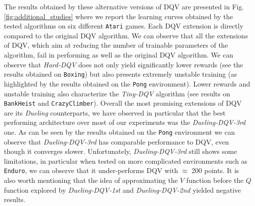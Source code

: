 The results obtained by these alternative versions of DQV are presented in Fig. \ref{fig:additional_studies} where we report the learning curves obtained by the tested algorithms on six different \texttt{Atari} games. Each DQV extension is directly compared to the original DQV algorithm. We can observe that all the extensions of DQV, which aim at reducing the number of trainable parameters of the algorithm, fail in performing as well as the original DQV algorithm. We can observe that \textit{Hard-DQV} does not only yield significantly lower rewards (see the results obtained on \texttt{Boxing}) but also presents extremely unstable training (as highlighted by the results obtained on the \texttt{Pong} environment). Lower rewards and unstable training also characterize the \textit{Tiny-DQV} algorithm (see results on \texttt{BankHeist} and \texttt{CrazyClimber}). Overall the most promising extensions of DQV are its \textit{Dueling} counterparts, we have observed in particular that the best performing architecture over most of our experiments was the \textit{Dueling-DQV-3rd} one. As can be seen by the results obtained on the \texttt{Pong} environment we can observe that \textit{Dueling-DQV-3rd} has comparable performance to DQV, even though it converges slower. Unfortunately, \textit{Dueling-DQV-3rd} still shows some limitations, in particular when tested on more complicated environments such as \texttt{Enduro}, we can observe that it under-performs DQV with $\approx$ 200 points. It is also worth mentioning that the idea of approximating the $V$ function before the $Q$ function explored by \textit{Dueling-DQV-1st} and \textit{Dueling-DQV-2nd} yielded negative results.


